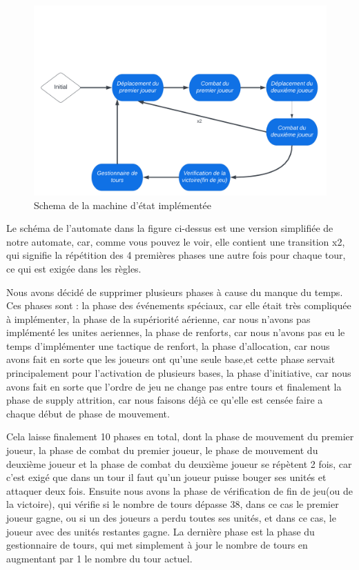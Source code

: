 \begin{figure}[H]
    \centering
    \includegraphics[scale=0.2]{data/State_Machine.png}
    \caption{Schema de la machine d'état implémentée}
    \label{fig:schema_state_machine}
\end{figure}

Le schéma de l'automate dans la figure ci-dessus est une version simplifiée de notre automate, car, comme vous pouvez le voir, elle contient une transition x2, qui signifie la répétition des 4 premières phases une autre fois pour chaque tour, ce qui est exigée dans les règles.

Nous avons décidé de supprimer plusieurs phases à cause du manque du temps. Ces phases sont : la phase des événements spéciaux, car elle était très compliquée à implémenter, la phase de la supériorité aérienne, car nous n'avons pas implémenté les unites aeriennes, la phase de renforts, car nous n'avons pas eu le temps d'implémenter une tactique de renfort, la phase d'allocation, car nous avons fait en sorte que les joueurs ont qu'une seule base,et cette phase servait principalement pour l'activation de plusieurs bases, la phase d'initiative, car nous avons fait en sorte que l'ordre de jeu ne change pas entre tours et finalement la phase de supply attrition, car nous faisons déjà ce qu'elle est censée faire a chaque début de phase de mouvement.

Cela laisse finalement 10 phases en total, dont la phase de mouvement du premier joueur, la phase de combat du premier joueur, le phase de mouvement du deuxième joueur et la phase de combat du deuxième joueur se répètent 2 fois, car c'est exigé que dans un tour il faut qu'un joueur puisse bouger ses unités et attaquer deux fois. Ensuite nous avons la phase de vérification de fin de jeu(ou de la victoire), qui vérifie si le nombre de tours dépasse 38, dans ce cas le premier joueur gagne, ou si un des joueurs a perdu toutes ses unités, et dans ce cas, le joueur avec des unités restantes gagne. La dernière phase est la phase du gestionnaire de tours, qui met simplement à jour le nombre de tours en augmentant par 1 le nombre du tour actuel.